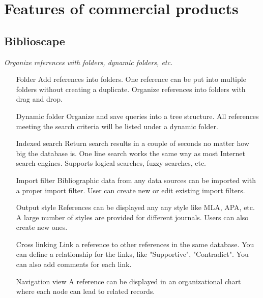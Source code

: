 
\section{Features of commercial products}
\label{sec:commfeat}

\subsection{Biblioscape}
\label{sec:biblioscapefeat}


                                                               


\textit{Organize references with folders, dynamic folders, etc.}
\begin{itemize}
 \item[Folder] \label{biblioscapefolder}
Add references into folders. One reference can be put into
 multiple folders without creating a duplicate. Organize references
 into folders with drag and drop.

 
 \item[Dynamic folder] Organize and save queries into a tree structure.
 All references meeting the search criteria will be listed under a
 dynamic folder.

 \item[Indexed search] Return search results in a couple of seconds no
 matter how big the database is. One line search works the same
 way as most Internet search engines. Supports logical searches,
 fuzzy searches, etc.

 \item[Import filter] Bibliographic data from any data sources can be
 imported with a proper import filter. User can create new or edit
 existing import filters.

 \item[Output style] References can be displayed any any style like MLA,
 APA, etc. A large number of styles are provided for different
 journals. Users can also create new ones.

 \item[Cross linking] Link a reference to other references in the same
 database. You can define a relationship for the links, like
 "Supportive", "Contradict". You can also add comments for each
 link.

 \item[Navigation view] A reference can be displayed in an organizational
 chart where each node can lead to related records.


\end{itemize}
